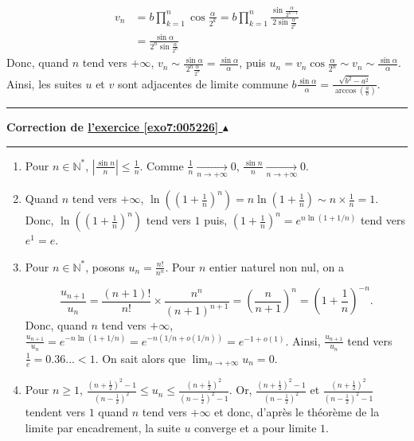 \documentclass[11pt,a4paper]{article}
\newcommand{\Nn}{\mathbb{N}} \newcommand{\N}{\mathbb{N}}
\newcommand{\Arccos}{\mathop{\mathrm{arccos}}\nolimits}
\newcounter{exo}
\newcommand{\correction}[1]{\hypertarget{cor7:#1}{}\label{cor7:#1}{\bf Correction de \hyperlink{exo7:#1}{l'exercice \ref{exo7:#1} $\blacktriangle$}}\vspace{1mm}\hrule\vspace{1mm}}
\newcommand{\fincorrection}{\vspace{1mm}\hrule\vspace*{7mm}}
\begin{document}
\begin{align*}
v_n&=b\prod_{k=1}^{n}\cos\frac{\alpha}{2^k}=b\prod_{k=1}^{n}\frac{\sin\frac{\alpha}{2^{k-1}}}
{2\sin\frac{\alpha}{2^k}}\\
 &=\frac{\sin\alpha}{2^n\sin\frac{\alpha}{2^n}}
\end{align*}
Donc, quand $n$ tend vers $+\infty$, $v_n\sim\frac{\sin\alpha}{2^n\frac{\alpha}{2^n}}=\frac{\sin\alpha}{\alpha}$, puis $u_n=v_n\cos\frac{\alpha}{2^n}\sim v_n\sim\frac{\sin\alpha}{\alpha}$.
Ainsi, les suites $u$ et $v$ sont adjacentes de limite commune $b\frac{\sin\alpha}{\alpha}=\frac{\sqrt{b^2-a^2}}{\Arccos\left(\frac{a}{b}\right)}$.
\fincorrection
\correction{005226}
\begin{enumerate}
 \item  Pour $n\in\Nn^*$, $\left|\frac{\sin n}{n}\right|\leq\frac{1}{n}$. Comme $\frac{1}{n}\underset{n\rightarrow+\infty}{\longrightarrow}0$, $\frac{\sin n}{n}\underset{n\rightarrow+\infty}{\longrightarrow}0$.

\begin{center}
\end{center}
 \item  Quand $n$ tend vers $+\infty$, $\ln\left(\left(1+\frac{1}{n}\right)^n\right)=n\ln\left(1+\frac{1}{n}\right)\sim n\times \frac{1}{n}=1$. Donc, $\ln\left(\left(1+\frac{1}{n}\right)^n\right)$ tend vers $1$ puis, $\left(1+\frac{1}{n}\right)^n=e^{n\ln(1+1/n)}$ tend vers $e^1=e$.

\begin{center}
\end{center}
 \item  Pour $n\in\Nn^*$, posons $u_n=\frac{n!}{n^n}$. Pour $n$ entier naturel non nul, on a

$$\frac{u_{n+1}}{u_n}=\frac{(n+1)!}{n!}\times\frac{n^n}{(n+1)^{n+1}}=\left(\frac{n}{n+1}\right)^n=\left(1+\frac{1}{n}\right)^{-n}.$$
Donc, quand $n$ tend vers $+\infty$, $\frac{u_{n+1}}{u_n}=e^{-n\ln(1+1/n)}=e^{-n(1/n+o(1/n))}=e^{-1+o(1)}$. Ainsi, $\frac{u_{n+1}}{u_n}$ tend vers $\frac{1}{e}=0.36...<1$. On sait alors que $\lim_{n\rightarrow +\infty}u_n=0$.

\begin{center}
\end{center}

 \item  Pour $n\geq1$, $\frac{(n+\frac{1}{2})^2-1}{(n-\frac{1}{2})^2}\leq u_n\leq\frac{(n+\frac{1}{2})^2}{(n-\frac{1}{2})^2-1}$. Or, $\frac{(n+\frac{1}{2})^2-1}{(n-\frac{1}{2})^2}$ et $\frac{(n+\frac{1}{2})^2}{(n-\frac{1}{2})^2-1}$ tendent vers $1$ quand $n$ tend vers $+\infty$ et donc, d'après le théorème de la limite par encadrement, la suite $u$ converge et a pour limite $1$.


\end{enumerate}
\end{document}

